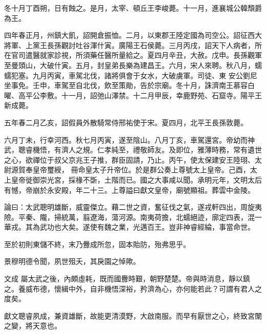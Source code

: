 \begin{pinyinscope}
 冬十月丁酉朔，日有蝕之。是月，太宰、頓丘王李峻薨。十一月，進襄城公韓頹爵為王。



 四年春正月，州鎮大飢，詔開倉振恤。二月，以東郡王陸定國為司空公。詔征西大將軍、上黨王長孫觀討吐谷渾什寅。廣陽王石侯薨。三月丙戌，詔天下人病者，所在官司遣醫就家診視，所須藥任醫所量給之。夏四月辛丑，大赦。戊申。長孫觀軍至曼頭山，大破什寅。五月，封皇弟長樂為建昌王。六月，宋人來聘。秋八月，蠕蠕犯塞。九月丙寅，車駕北伐，諸將俱會于女水，大破虜軍。司徒、東
 安公劉尼坐事免。壬申，車駕至自北伐，飲至策勛，告於宗廟。冬十月，誅濟南王慕容白曜、高平公李敷。十一月，詔弛山澤禁。十二月甲辰，幸鹿野苑、石窟寺。陽平王新成薨。



 五年春二月乙亥，詔假員外散騎常侍邢祐使于宋。夏四月，北平王長孫敦薨。



 六月丁未，行幸河西。秋七月丙寅，遂至陰山。八月丁亥，車駕還宮。帝幼而神武，聰睿機悟，有濟人之規。仁孝純至，禮敬師友。及即位，雅薄時務，常有遺世之心，欲禪位于叔父京兆王子推，群臣固請，乃止。丙午，使太保建安王陸珝、太尉源賀奉皇帝璽綬，
 冊命皇太子升帝位。於是群公奏上尊號太上皇帝。己酉，太上皇帝徙御崇光宮，採椽不斲，土階而已。國之大事咸以聞。承明元年，文明太后有憾，帝崩於永安殿，年二十三。上尊謚曰獻文皇帝，廟號顯祖。葬雲中金陵。



 論曰：太武聰明雄斷，威靈傑立。藉二世之資，奮征伐之氣，遂戎軒四出，周旋夷險。平秦、隴，掃統萬，翦遼海，蕩河源。南夷荷擔，北蠕絕迹，廓定四表，混一華戎。其為武功也大矣。遂使有魏之業，光邁百王。豈非神睿經綸，事當命世。



 至於初則東儲不終，末乃釁成所忽，固本貽防，殆弗思乎。



 景穆明德令聞，夙世殂夭，其戾園之悼歟。



 文成
 屬太武之後，內頗虛耗，既而國釁時艱，朝野楚楚。帝與時消息，靜以鎮之。養威布德，懷緝中外，自非機悟深裕，矜濟為心，亦何能若此？可謂有君人之度矣。



 獻文聰睿夙成，兼資雄斷，故能更清漠野，大啟南服。而早有厭世之心，終致宮闈之變，將天意也。



\end{pinyinscope}